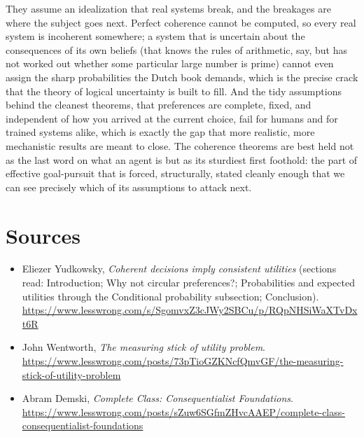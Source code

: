 \documentclass[10pt]{article}
\theoremstyle{definition}
\theoremstyle{remark}
\begin{document}
They assume an idealization that real systems break, and the breakages are where the subject goes next. Perfect coherence cannot be computed, so every real system is incoherent somewhere; a system that is uncertain about the consequences of its own beliefs (that knows the rules of arithmetic, say, but has not worked out whether some particular large number is prime) cannot even assign the sharp probabilities the Dutch book demands, which is the precise crack that the theory of logical uncertainty is built to fill. And the tidy assumptions behind the cleanest theorems, that preferences are complete, fixed, and independent of how you arrived at the current choice, fail for humans and for trained systems alike, which is exactly the gap that more realistic, more mechanistic results are meant to close. The coherence theorems are best held not as the last word on what an agent is but as its sturdiest first foothold: the part of effective goal-pursuit that is forced, structurally, stated cleanly enough that we can see precisely which of its assumptions to attack next.

\section*{Sources}

\begin{itemize}[leftmargin=1.5em]
\item Eliezer Yudkowsky, \emph{Coherent decisions imply consistent utilities} (sections read: Introduction; Why not circular preferences?; Probabilities and expected utilities through the Conditional probability subsection; Conclusion). \url{https://www.lesswrong.com/s/SgomvxZ3cJWy2SBCu/p/RQpNHSiWaXTvDxt6R}
\item John Wentworth, \emph{The measuring stick of utility problem}. \url{https://www.lesswrong.com/posts/73pTioGZKNcfQmvGF/the-measuring-stick-of-utility-problem}
\item Abram Demski, \emph{Complete Class: Consequentialist Foundations}. \url{https://www.lesswrong.com/posts/sZuw6SGfmZHvcAAEP/complete-class-consequentialist-foundations}
\end{itemize}
\end{document}
